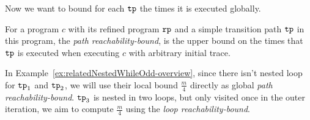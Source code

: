 Now we want to bound for each $\mathtt{tp}$ the times it is executed  globally.
%
\begin{defn}
For a program $c$ with its refined program $\mathtt{rp}$ and a simple transition path $\mathtt{tp}$ in this program, 
the \emph{path reachability-bound},
is the upper bound on the
times that $\mathtt{tp}$ is executed when executing $c$ with arbitrary initial trace.
\end{defn}
%
In Example~\ref{ex:relatedNestedWhileOdd-overview}, since there isn't nested loop for $\mathtt{tp}_1$ and $\mathtt{tp}_2$, we will use their local bound $\frac{m}{4}$ directly as global \emph{path reachability-bound}.
$\mathtt{tp}_3$ is nested in two loops, but only visited once in the outer iteration, we aim to compute $\frac{m}{4}$ using the \emph{loop reachability-bound}.

